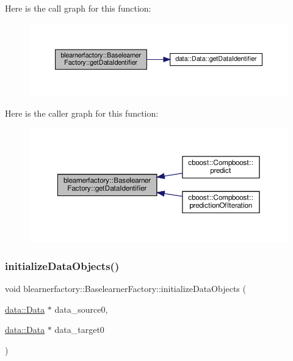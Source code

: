 Here is the call graph for this function\+:
\nopagebreak
\begin{figure}[H]
\begin{center}
\leavevmode
\includegraphics[width=350pt]{classblearnerfactory_1_1_baselearner_factory_a40703963bb3fd273b835a99263d9b599_cgraph}
\end{center}
\end{figure}
Here is the caller graph for this function\+:
\nopagebreak
\begin{figure}[H]
\begin{center}
\leavevmode
\includegraphics[width=350pt]{classblearnerfactory_1_1_baselearner_factory_a40703963bb3fd273b835a99263d9b599_icgraph}
\end{center}
\end{figure}
\mbox{\label{classblearnerfactory_1_1_baselearner_factory_a147d4ef123ec382fe402d562a91df4d2}} 
\subsubsection{\texorpdfstring{initialize\+Data\+Objects()}{initializeDataObjects()}}
{\footnotesize\ttfamily void blearnerfactory\+::\+Baselearner\+Factory\+::initialize\+Data\+Objects (\begin{DoxyParamCaption}\item[{\hyperlink{classdata_1_1_data}{data\+::\+Data} $\ast$}]{data\+\_\+source0,  }\item[{\hyperlink{classdata_1_1_data}{data\+::\+Data} $\ast$}]{data\+\_\+target0 }\end{DoxyParamCaption})}

